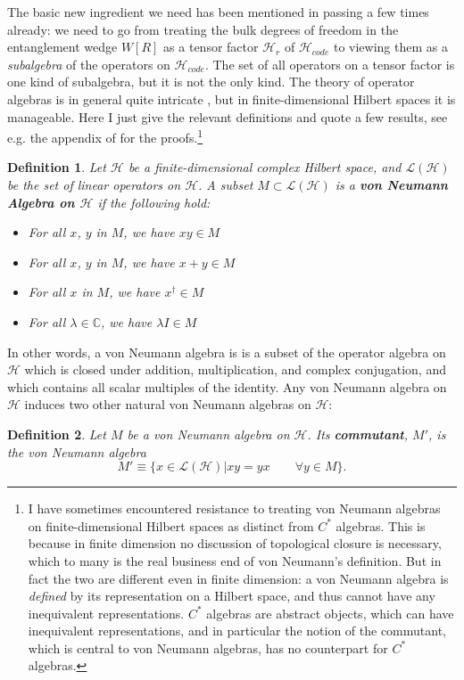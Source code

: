 \documentclass[toc]{PoS}
\newcommand{\be}{\begin{equation}}
\newcommand{\ee}{\end{equation}}
\newcommand{\bi}{\begin{itemize}}
\newcommand{\ei}{\end{itemize}}
\newcommand{\Ll}{\mathcal{L}}
\newcommand{\Hh}{\mathcal{H}}
\newcommand{\Hc}{\mathcal{H}_{code}}
\newtheorem{mydef}{Definition}[section]
\begin{document}
The basic new ingredient we need has been mentioned in passing a few times already: we need to go from treating the bulk degrees of freedom in the entanglement wedge $W[R]$ as a tensor factor $\mathcal{H}_r$ of $\Hc$ to viewing them as a \textit{subalgebra} of the operators on $\Hc$.  The set of all operators on a tensor factor is one kind of subalgebra, but it is not the only kind.  The theory of operator algebras is in general quite intricate \cite{Jones}, but in finite-dimensional Hilbert spaces it is manageable.  Here I just give the relevant definitions and quote a few results, see e.g. the appendix of \cite{Harlow:2016vwg} for the proofs.\footnote{I have sometimes encountered resistance to treating von Neumann algebras on finite-dimensional Hilbert spaces as distinct from $C^*$ algebras.  This is because in finite dimension no discussion of topological closure is necessary, which to many is the real business end of von Neumann's definition.  But in fact the two are different even in finite dimension: a von Neumann algebra is \textit{defined} by its representation on a Hilbert space, and thus cannot have any inequivalent representations.  $C^*$ algebras are abstract objects, which can have inequivalent representations, and in particular the notion of the commutant, which is central to von Neumann algebras, has no counterpart for $C^*$ algebras.}
\begin{mydef}
Let $\Hh$ be a finite-dimensional complex Hilbert space, and $\mathcal{L}(\mathcal{H})$ be the set of linear operators on $\Hh$.  A subset $M\subset \Ll(\Hh)$ is a \textbf{von Neumann Algebra on $\Hh$} if the following hold:
\bi
\item For all $x$, $y$ in $M$, we have $xy\in M$
\item For all $x$, $y$ in $M$, we have $x+y\in M$
\item For all $x$ in $M$, we have $x^\dagger\in M$
\item For all $\lambda \in \mathbb{C}$, we have $\lambda I \in M$
\ei
\end{mydef}
In other words, a von Neumann algebra is is a subset of the operator algebra on $\Hh$ which is closed under addition, multiplication, and complex conjugation, and which contains all scalar multiples of the identity.  Any von Neumann algebra on $\Hh$ induces two other natural von Neumann algebras on $\Hh$:
\begin{mydef}
Let $M$ be a von Neumann algebra on $\Hh$.  Its \textbf{commutant}, $M'$, is the von Neumann algebra
\be
M'\equiv \{x\in \Ll(\Hh)|xy=yx \qquad\forall y \in M\}.
\ee
\end{mydef}
\end{document}
